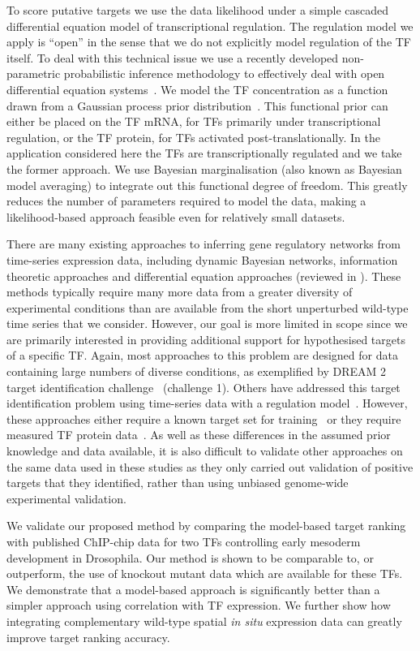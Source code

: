 \documentclass{pnastwo}
\begin{document}
\begin{article}
To score putative targets we use the data likelihood under a simple
cascaded differential equation model of transcriptional regulation. The regulation model
we apply is ``open'' in the sense that we do not explicitly model regulation of the TF
itself. To deal with this technical issue we use a recently developed
non-parametric probabilistic inference methodology to
effectively deal with open differential equation
systems~\cite{Gao2008}. We model the TF concentration as a function
drawn from a Gaussian process prior distribution~\cite{Rasmussen2006}. This functional prior can either be placed
on the TF mRNA, for TFs primarily under transcriptional regulation,
or the TF protein, for TFs activated post-translationally. In the
application considered here the TFs are transcriptionally regulated
and we take the former approach. We use Bayesian marginalisation (also
known as Bayesian model averaging) to
integrate out this functional degree of freedom. This greatly reduces the
number of parameters required to model the data, making a
likelihood-based approach feasible even for relatively small
datasets. 

There are many existing approaches to inferring gene regulatory networks from
time-series expression data, including dynamic Bayesian networks,
information theoretic approaches and differential equation approaches
(reviewed in \cite{Bansal2007a}). These methods typically require many
more data from a greater diversity of experimental conditions than are
available from the short unperturbed wild-type time series that we
consider. However, our goal is more limited in scope since
we are primarily interested in providing additional support for hypothesised
targets of a specific TF. Again, most approaches to this problem are
designed for data containing large numbers of diverse conditions, as
exemplified by DREAM 2 target identification
challenge~\cite{Stolovitzky2007} (challenge 1). Others
have addressed this target identification problem using time-series
data with a regulation model~\cite{Barenco2006a,Gatta2008}. However,
these approaches either require a known target set for training~\cite{Barenco2006a} or
they require measured TF protein data~\cite{Gatta2008}. As well as
these differences in the assumed prior knowledge and data available,
it is also difficult to validate other approaches on the same data used in these
studies as they only carried out validation of positive targets
that they identified, rather than using unbiased genome-wide
experimental validation. 

We validate our proposed method by comparing the model-based target
ranking with published ChIP-chip data for two TFs controlling early
mesoderm development in Drosophila. Our method is shown to be comparable
to, or outperform, the use of knockout mutant data which are available
for these TFs. We demonstrate that a model-based approach is significantly
better than a simpler approach using correlation with TF
expression. We further show how integrating complementary wild-type spatial
{\em in situ} expression data can greatly improve target ranking accuracy. 


\end{article}
\end{document}
